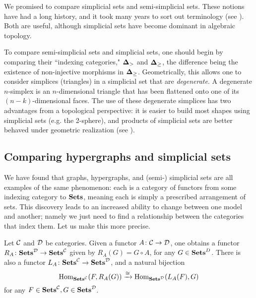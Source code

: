 \documentclass{amsart}
\def\bD{{\bf \Delta}}
\begin{document}
\begin{remark}\label{rem:difference semi vs. simp}

We promised to compare simplicial sets and semi-simplicial sets.  These notions have had a long history, and it took many years to sort out terminology (see \cite{Jam}).  Both are useful, although simplicial sets have become dominant in algebraic topology. 

To compare semi-simplicial sets and simplicial sets, one should begin by comparing their ``indexing categories," $\bD_>$ and $\bD_\geq$, the difference being the existence of non-injective morphisms in $\bD_\geq$.  Geometrically, this allows one to consider simplices (triangles) in a simplicial set that are {\em degenerate}.  A degenerate $n$-simplex is an $n$-dimensional triangle that has been flattened onto one of its $(n-k)$-dimensional faces.  The use of these degenerate simplices has two advantages from a topological perspective: it is easier to build most shapes using simplicial sets (e.g. the 2-sphere), and products of simplicial sets are better behaved under geometric realization (see \cite{Hov}).

\end{remark}

\subsection{Comparing hypergraphs and simplicial sets}\label{subsec:comparisons}

We have found that graphs, hypergraphs, and (semi-) simplicial sets are all examples of the same phenomenon: each is a category of functors from some indexing category to ${\bf Sets}$, meaning each is simply a prescribed arrangement of sets.  This discovery leads to an increased ability to change between one model and another; namely we just need to find a relationship between the categories that index them.  Let us make this more precise.

\begin{lemma}\label{lemma:indexed adjunction}

Let $\mathcal{C}$ and $\mathcal{D}$ be categories.  Given a functor $A\colon\mathcal{C}\rightarrow\mathcal{D}$, one obtains a functor $R_A\colon{\bf Sets}^\mathcal{D}\rightarrow{\bf Sets}^\mathcal{C}$ given by $R_A(G)=G\circ A$, for any $G\in{\bf Sets}^D$.  There is also a functor $L_A\colon{\bf Sets}^\mathcal{C}\rightarrow{\bf Sets}^\mathcal{D}$, and a natural bijection $$\textnormal{Hom}_{{\bf Sets}^\mathcal{C}}(F,R_A(G))\xrightarrow{\cong}\textnormal{Hom}_{{\bf Sets}^\mathcal{D}}(L_A(F),G)$$ for any $F\in{\bf Sets}^\mathcal{C}, G\in{\bf Sets}^\mathcal{D}$.

\end{lemma}
\end{document}
